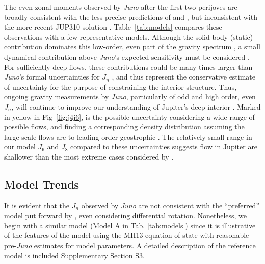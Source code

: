 
The even zonal moments observed by \textit{Juno} after the first two perijoves
\citep{Folkner2017} are broadly consistent with the less precise predictions of
\citet{Campbell1985} and \citet{Jacobson2003}, but inconsistent with the more
recent JUP310 solution \citep{Jacobson2013}.  Table~\ref{tab:models} compares
these observations with a few representative models. 
Although the solid-body (static) contribution dominates this low-order, even
part of the gravity spectrum \citep{Hubbard1999}, a small dynamical
contribution above \textit{Juno}'s expected sensitivity must be considered
\citep{Kaspi2010}.  For sufficiently deep flows, these contributions could be
many times larger than \textit{Juno}'s formal uncertainties for $J_n$
\citep{Kaspi2017}, and thus represent the conservative estimate of uncertainty
for the purpose of constraining the interior structure. Thus, ongoing gravity
measurements by \textit{Juno}, particularly of odd and high order, even $J_n$,
will continue to improve our understanding of Jupiter's deep interior
\citep{Kaspi2013}.  Marked in yellow in Fig~\ref{fig:j4j6}, is the possible
uncertainty considering a wide range of possible flows, and finding a
corresponding density distribution assuming the large scale flows are to
leading order geostrophic \citep{Kaspi2009}.  The relatively small range in our
model $J_6$ and $J_8$ compared to these uncertainties suggests flow in Jupiter
are shallower than the most extreme cases considered by \citet{Kaspi2017}. 


\subsection{Model Trends} \label{sec:trends}

It is evident that the $J_n$ observed by \textit{Juno} are not consistent with
the ``preferred'' model put forward by \citet{hubbard2016}, even considering
differential rotation. Nonetheless, we begin with a similar model (Model A in
Tab.  \ref{tab:models}) since it is illustrative of the features of the model
using the MH13 equation of state with reasonable pre-\textit{Juno} estimates
for model parameters. A detailed description of the reference model is included
Supplementary Section S3.

